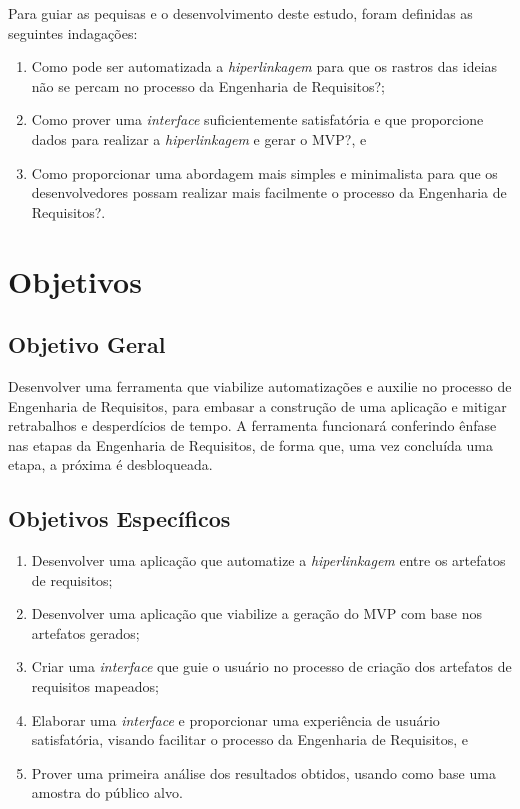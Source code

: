 \label{ref:questao_pesquisa}

Para guiar as pequisas e o desenvolvimento deste estudo, foram definidas as seguintes indagações:

\begin{enumerate}
    \item Como pode ser automatizada a \textit{hiperlinkagem} para que os rastros das ideias não se percam no processo da Engenharia de Requisitos?;
    \item Como prover uma \textit{interface} suficientemente satisfatória e que proporcione dados para realizar a \textit{hiperlinkagem} e gerar o MVP?, e
    \item Como proporcionar uma abordagem mais simples e minimalista para que os desenvolvedores possam realizar mais facilmente o processo da Engenharia de Requisitos?.
\end{enumerate}

\section{Objetivos}

\label{ref:objetivos}

\subsection{Objetivo Geral}

Desenvolver uma ferramenta que viabilize automatizações e auxilie no processo de Engenharia de Requisitos, para embasar a construção de uma aplicação e mitigar retrabalhos e desperdícios de tempo. A ferramenta funcionará conferindo ênfase nas etapas da Engenharia de Requisitos, de forma que, uma vez concluída uma etapa, a próxima é desbloqueada.

\subsection{Objetivos Específicos}

\begin{enumerate}
    \item \label{oe_hiperlinkagem} Desenvolver uma aplicação que automatize a \textit{hiperlinkagem} entre os artefatos de requisitos;
    \item \label{oe_mvp} Desenvolver uma aplicação que viabilize a geração do MVP com base nos artefatos gerados;
    \item \label{oe_guiar_usuario} Criar uma \textit{interface} que guie o usuário no processo de criação dos artefatos de requisitos mapeados;
    \item \label{oe_ux_facilitada} Elaborar uma \textit{interface} e proporcionar uma experiência de usuário satisfatória, visando facilitar o processo da Engenharia de Requisitos, e
    \item \label{oe_resultados} Prover uma primeira análise dos resultados obtidos, usando como base uma amostra do público alvo.
\end{enumerate}

